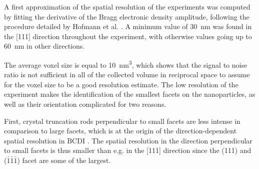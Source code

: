 A first approximation of the spatial resolution of the experiments was computed by fitting the derivative of the Bragg electronic density amplitude, following the procedure detailed by Hofmann et al. \parencite*{Hofmann2020}.
A minimum value of \qty{30}{\nm} was found in the [111] direction throughout the experiment, with otherwise values going up to \qty{60}{\nm} in other directions.

The average voxel size %
is equal to \qty{10}{\nm^3}, which shows that the signal to noise ratio is not sufficient in all of the collected volume in reciprocal space to assume for the voxel size to be a good resolution estimate.
The low resolution of the experiment makes the identification of the smallest facets on the nanoparticles, as well as their orientation complicated for two reasons.


First, crystal truncation rods perpendicular to small facets are less intense in comparison to large facets, which is at the origin of the direction-dependent spatial resolution in BCDI \parencite{Cherukara2018a}.
The spatial resolution in the direction perpendicular to small facets is thus smaller than e.g. in the [111] direction since the (111) and ($\bar{1}\bar{1}\bar{1}$) facet are some of the largest.


